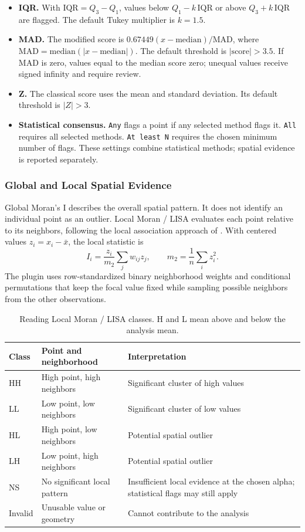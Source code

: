\documentclass[11pt,a4paper]{article}
\begin{document}
\begin{itemize}
    \item \textbf{IQR.} With $\mathrm{IQR}=Q_3-Q_1$, values below $Q_1-k\,\mathrm{IQR}$ or above $Q_3+k\,\mathrm{IQR}$ are flagged. The default Tukey multiplier is $k=1.5$.
    \item \textbf{MAD.} The modified score is $0.67449(x-\mathrm{median})/\mathrm{MAD}$, where $\mathrm{MAD}=\mathrm{median}(|x-\mathrm{median}|)$. The default threshold is $|\mathrm{score}|>3.5$. If MAD is zero, values equal to the median score zero; unequal values receive signed infinity and require review.
    \item \textbf{Z.} The classical score uses the mean and standard deviation. Its default threshold is $|Z|>3$.
    \item \textbf{Statistical consensus.} \texttt{Any} flags a point if any selected method flags it. \texttt{All} requires all selected methods. \texttt{At least N} requires the chosen minimum number of flags. These settings combine statistical methods; spatial evidence is reported separately.
\end{itemize}

\subsubsection{Global and Local Spatial Evidence}

Global Moran's I describes the overall spatial pattern. It does not identify an individual point as an outlier. Local Moran / LISA evaluates each point relative to its neighbors, following the local association approach of \citet{anselin1995}. With centered values $z_i=x_i-\bar{x}$, the local statistic is
\[
 I_i=\frac{z_i}{m_2}\sum_j w_{ij}z_j,
 \qquad m_2=\frac{1}{n}\sum_i z_i^2.
\]
The plugin uses row-standardized binary neighborhood weights and conditional permutations that keep the focal value fixed while sampling possible neighbors from the other observations.

\begin{table}[H]
\centering
\caption{Reading Local Moran / LISA classes. H and L mean above and below the analysis mean.}
\label{tab:lisa-classes}
\begin{tabularx}{0.96\textwidth}{P{1.3cm}P{4.3cm}Y}
\toprule
\textbf{Class} & \textbf{Point and neighborhood} & \textbf{Interpretation} \\
\midrule
HH & High point, high neighbors & Significant cluster of high values \\
LL & Low point, low neighbors & Significant cluster of low values \\
HL & High point, low neighbors & Potential spatial outlier \\
LH & Low point, high neighbors & Potential spatial outlier \\
NS & No significant local pattern & Insufficient local evidence at the chosen alpha; statistical flags may still apply \\
Invalid & Unusable value or geometry & Cannot contribute to the analysis \\
\bottomrule
\end{tabularx}
\end{table}
\end{document}

